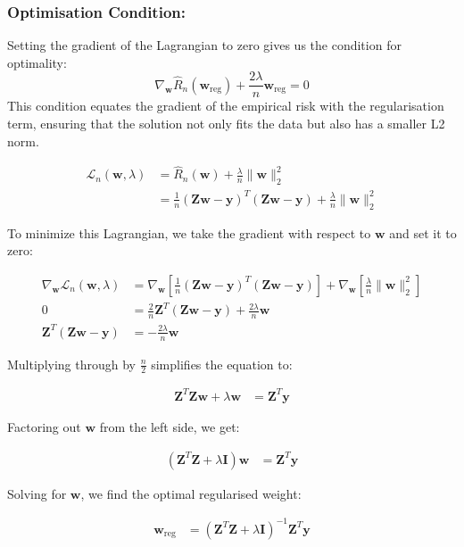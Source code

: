 \subsubsection*{Optimisation Condition:}
Setting the gradient of the Lagrangian to zero gives us the condition for optimality:
\[
\nabla_{\mathbf{w}}\hat{R}_n(\mathbf{w}_{\text{reg}}) + \frac{2\lambda}{n} \mathbf{w}_{\text{reg}} = 0
\]
This condition equates the gradient of the empirical risk with the regularisation term, ensuring that the solution not only fits the data but also has a smaller L2 norm.

\begin{align*}
\mathcal{L}_n(\mathbf{w}, \lambda) &= \hat{R}_n(\mathbf{w}) + \frac{\lambda}{n}\|\mathbf{w}\|_2^2 \\
&= \frac{1}{n} (\mathbf{Zw} - \mathbf{y})^T (\mathbf{Zw} - \mathbf{y}) + \frac{\lambda}{n}\|\mathbf{w}\|_2^2
\end{align*}

To minimize this Lagrangian, we take the gradient with respect to \( \mathbf{w} \) and set it to zero:

\begin{align*}
\nabla_{\mathbf{w}}\mathcal{L}_n(\mathbf{w}, \lambda) &= \nabla_{\mathbf{w}} \left[ \frac{1}{n} (\mathbf{Zw} - \mathbf{y})^T (\mathbf{Zw} - \mathbf{y}) \right] + \nabla_{\mathbf{w}} \left[ \frac{\lambda}{n}\|\mathbf{w}\|_2^2 \right] \\
0&= \frac{2}{n} \mathbf{Z}^T (\mathbf{Zw} - \mathbf{y}) + \frac{2\lambda}{n} \mathbf{w} \\
 \mathbf{Z}^T (\mathbf{Zw} - \mathbf{y}) &= -\frac{2\lambda}{n} \mathbf{w}
\end{align*}

Multiplying through by \( \frac{n}{2} \) simplifies the equation to:

\begin{align*}
\mathbf{Z}^T \mathbf{Zw} + \lambda \mathbf{w} &= \mathbf{Z}^T \mathbf{y}
\end{align*}

Factoring out \( \mathbf{w} \) from the left side, we get:

\begin{align*}
(\mathbf{Z}^T \mathbf{Z} + \lambda \mathbf{I}) \mathbf{w} &= \mathbf{Z}^T \mathbf{y}
\end{align*}

Solving for \( \mathbf{w} \), we find the optimal regularised weight:

\begin{align*}
\mathbf{w}_{\text{reg}} &= (\mathbf{Z}^T \mathbf{Z} + \lambda \mathbf{I})^{-1} \mathbf{Z}^T \mathbf{y}
\end{align*}


